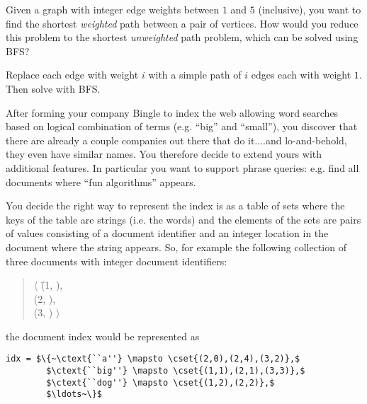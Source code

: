 
\begin{problem}

\answer

Given a graph with integer edge weights between $1$ and $5$
(inclusive), you want to find the shortest \emph{weighted} path
between a pair of vertices.  How would you reduce this problem to the
shortest \emph{unweighted} path problem, which can be solved using
BFS?

\sol
  Replace each edge with weight $i$ with a simple path of $i$ edges
  each with weight $1$. Then solve with BFS.
\end{problem}




After forming your company Bingle to index the web allowing word
searches based on logical combination of terms (e.g. ``big'' and
``small''), you discover that there are already a couple companies out
there that do it....and lo-and-behold, they even have similar names.
You therefore decide to extend yours with additional features.  In
particular you want to support phrase queries: e.g. find all
documents where ``fun algorithms'' appears.

You decide the right way to represent the index is as a table of sets
where the keys of the table are strings (i.e. the words) and the
elements of the sets are pairs of values consisting of a document
identifier and an integer location in the document where the string
appears.  So, for example the following collection of three documents
with integer document identifiers:

\begin{quote}
\begin{tabbing}
 $\langle$
  \=(1, ), \\
  \>(2, ),\\
  \>(3, ) $\rangle$
\end{tabbing}
\end{quote}

the document index would be represented as
\begin{lstlisting}[numbers=none]
idx = $\{~\ctext{``a''} \mapsto \cset{(2,0),(2,4),(3,2)},$
        $\ctext{``big''} \mapsto \cset{(1,1),(2,1),(3,3)},$
        $\ctext{``dog''} \mapsto \cset{(1,2),(2,2)},$
        $\ldots~\}$
\end{lstlisting}

